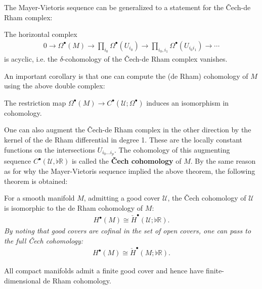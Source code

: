 
    The Mayer-Vietoris sequence can be generalized to a statement for the \v{C}ech-de Rham complex:
    \begin{property}
        The horizontal complex
        \begin{gather}
            0\longrightarrow\Omega^\bullet(M)\longrightarrow\prod_{i_0}\Omega^\bullet(U_{i_0})\longrightarrow\prod_{i_0,i_1}\Omega^\bullet(U_{i_0i_1})\longrightarrow\cdots
        \end{gather}
        is acyclic, i.e. the $\delta$-cohomology of the \v{C}ech-de Rham complex vanishes.
    \end{property}

    An important corollary is that one can compute the (de Rham) cohomology of $M$ using the above double complex:
    \begin{property}
        The restriction map $\Omega^\bullet(M)\rightarrow C^\bullet(\mathcal{U};\Omega^\bullet)$ induces an isomorphism in cohomology.
    \end{property}
    One can also augment the \v{C}ech-de Rham complex in the other direction by the kernel of the de Rham differential in degree 1. These are the locally constant functions on the intersections $U_{i_0\ldots i_p}$. The cohomology of this augmenting sequence $C^\bullet(\mathcal{U},\flat\mathbb{R})$ is called the \textbf{\v{C}ech cohomology} of $M$. By the same reason as for why the Mayer-Vietoris sequence implied the above theorem, the following theorem is obtained:
    \begin{theorem}[\v{C}ech $=$ de Rham]
        For a smooth manifold $M$, admitting a good cover $\mathcal{U}$, the \v{C}ech cohomology of $\mathcal{U}$ is isomorphic to the de Rham cohomology of $M$:
        \begin{gather}
            H^\bullet(M)\cong\check{H}^\bullet(\mathcal{U};\flat\mathbb{R}).
        \end{gather}
        \emph{By noting that good covers are \textit{cofinal} in the set of open covers, one can pass to the full \v{C}ech cohomology:}
        \begin{gather}
            H^\bullet(M)\cong\check{H}^\bullet(M;\flat\mathbb{R}).
        \end{gather}
    \end{theorem}
    \begin{result}
        All compact manifolds admit a finite good cover and hence have finite-dimensional de Rham cohomology.
    \end{result}

